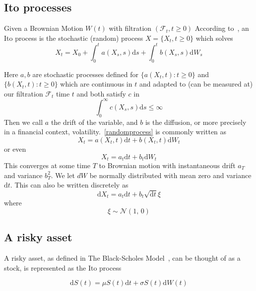 \documentclass[11pt]{article} %
\begin{document}
\subsection{Ito processes}
Given a Brownian Motion $W(t)$ with filtration $(\mathcal{F}_t, t \geq 0 )$
According to~\cite{itoprocess}, an Ito process is the stochastic (random) 
process $X = \{X_t, t \geq 0\}$ which solves 
\begin{equation} \label{randomprocess}
X_t = X_0 + \int_{0}^{t} a(X_s, s)\mathrm{d}s + 
\int_{0}^{t} b(X_s, s) \mathrm{d}W_s
\end{equation}

Here $a,b$ are stochastic 
processes defined for $\{a(X_t, t) : t\geq0\} $ and $\{b(X_t, t) : t\geq0\}$ which are 
continuous in $t$ and adapted to (can be measured at) our filtration $\mathcal{F}_t$ 
time $t$ and 
both satisfy $c$ in 
\[\int_{0}^{\infty} c(X_s, s) \mathrm{d}s \leq \infty\]
Then we call $a$ the drift of the variable, and $b$ is the diffusion, 
or more precisely in a financial context, volatility.~\eqref{randomprocess} is commonly 
written as 
\begin{equation}
    X_t = a(X_t, t)\mathrm{d}t + b(X_t, t)\mathrm{d}W_t
\end{equation}
or even 
\begin{equation} \label{itoprocess}
    X_t = a_t\mathrm{d}t + b_t\mathrm{d}W_t
\end{equation}
This converges at some time $T$ to Brownian motion with instantaneous drift $a_T$ and
variance $b_T^2$. We let $dW$ be normally distributed with mean zero and variance 
$\mathrm{d}t$. This can also be written discretely as 
\begin{equation}
    \mathrm{d}X_t = a_t\mathrm{d}t + b_t \sqrt{\mathrm{d}t}\xi
\end{equation}
where
\begin{equation}
    \xi \sim \mathcal{N}(1,\,0)
\end{equation}

\subsection{A risky asset}

A risky asset, as defined in The Black-Scholes Model~\cite{blackscholes}, 
can be thought of as a stock, is represented as the Ito process

\begin{equation} \label{riskyasset}
    \mathrm{d}S(t) = \mu S(t)\mathrm{d}t + \sigma S(t) \mathrm{d}W(t)
\end{equation}
\end{document}
